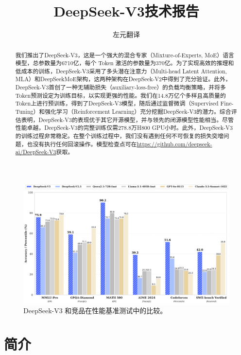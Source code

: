 \documentclass[lang=cn,a4paper,newtx]{elegantpaper}
\title{DeepSeek-V3技术报告}
\author{左元翻译}
\newcommand{\dsvii}{DeepSeek-V2}
\newcommand{\dsmoe}{DeepSeekMoE}
\newcommand{\dsviii}{DeepSeek-V3}
\begin{document}
\maketitle

\begin{abstract}
    我们推出了\dsviii{}，这是一个强大的混合专家（Mixture-of-Experts, MoE）语言模型，总参数量为6710亿，每个 Token 激活的参数量为370亿。为了实现高效的推理和低成本的训练，\dsviii{}采用了多头潜在注意力（Multi-head Latent Attention, MLA）和\dsmoe{}架构，这两种架构在\dsvii{}中得到了充分验证。此外，\dsviii{}首创了一种无辅助损失（auxiliary-loss-free）的负载均衡策略，并将多Token预测设定为训练目标，以实现更强的性能。我们在14.8万亿个多样且高质量的Token上进行预训练，得到了\dsviii{}模型，随后通过监督微调（Supervised Fine-Tuning）和强化学习（Reinforcement Learning）充分挖掘\dsviii{}的潜力。综合评估表明，\dsviii{}的表现优于其它开源模型，并与领先的闭源模型性能相当。尽管性能卓越，\dsviii{}的完整训练仅需278.8万H800 GPU小时。此外，\dsviii{}的训练过程非常稳定。在整个训练过程中，我们没有遇到任何不可恢复的损失突增问题，也没有执行任何回滚操作。模型检查点可在\url{https://github.com/deepseek-ai/DeepSeek-V3}获取。
\end{abstract}

\begin{figure}[h]
\centering
\includegraphics[width=\textwidth]{figures/dsv3_performance.pdf}
\caption{
    \centering
    \dsviii{} 和竞品在性能基准测试中的比较。
}
\label{fig:dsv3_performance}
\end{figure}

\newpage
\tableofcontents
\newpage

\section{简介}
\end{document}
